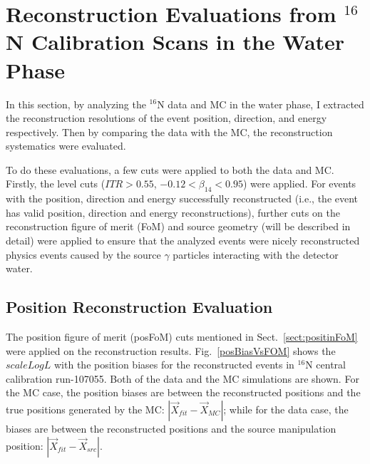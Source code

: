 \section{Reconstruction Evaluations from $^{16}$N Calibration Scans in the Water Phase}

In this section, by analyzing the $^{16}$N data and MC in the water phase, I extracted the reconstruction resolutions of the event position, direction, and energy respectively. Then by comparing the data with the MC, the reconstruction systematics were evaluated.

To do these evaluations, a few cuts were applied to both the data and MC. Firstly, the level cuts  ($ITR>0.55$, $-0.12<\beta_{14}<0.95$) were applied. For events with the position, direction and energy successfully reconstructed (i.e., the event has valid position, direction and energy reconstructions), further cuts on the reconstruction figure of merit (FoM) and source geometry (will be described in detail) were applied to ensure that the analyzed events were nicely reconstructed physics events caused by the source $\gamma$ particles interacting with the detector water.

\subsection{Position Reconstruction Evaluation}
The position figure of merit (posFoM) cuts mentioned in Sect.~\ref{sect:positinFoM} were applied on the reconstruction results. Fig.~\ref{posBiasVsFOM} shows the $scaleLogL$ with the position biases for the reconstructed events in $^{16}$N central calibration run-107055. Both of the data and the MC simulations are shown. For the MC case, the position biases are between the reconstructed positions and the true positions generated by the MC: $|\vec{X}_{fit}-\vec{X}_{MC}|$; while for the data case, the biases are between the reconstructed positions and the source manipulation position: $|\vec{X}_{fit}-\vec{X}_{src}|$.

